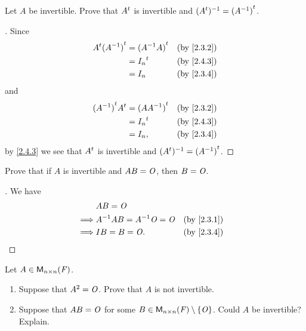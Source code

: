 \begin{ex}\label{ex:2.4.5}
	Let \(A\) be invertible.
	Prove that \({A}^{t}\) is invertible and \(({A}^{t})^{-1} = {(A^{-1})}^{t}\).
\end{ex}

\begin{proof}[]
	Since
	\begin{align*}
		\tp{A} \tp{(A^{-1})} & = \tp{(A^{-1} A)} &  & \by{2.3.2} \\
		                     & = \tp{I_n}        &  & \by{2.4.3} \\
		                     & = I_n             &  & \by{2.3.4}
	\end{align*}
	and
	\begin{align*}
		\tp{(A^{-1})} \tp{A} & = \tp{(A A^{-1})} &  & \by{2.3.2} \\
		                     & = \tp{I_n}        &  & \by{2.4.3} \\
		                     & = I_n,            &  & \by{2.3.4}
	\end{align*}
	by \cref{2.4.3} we see that \({A}^{t}\) is invertible and \(({A}^{t})^{-1} = {(A^{-1})}^{t}\).
\end{proof}

\begin{ex}\label{ex:2.4.6}
	Prove that if \(A\) is invertible and \(AB = \mathit{O}\), then \(B = \mathit{O}\).
\end{ex}

\begin{proof}[]
	We have
	\begin{align*}
		         & AB = \zm                                     \\
		\implies & A^{-1} AB = A^{-1} \zm = \zm &  & \by{2.3.1} \\
		\implies & IB = B = \zm.                &  & \by{2.3.4}
	\end{align*}
\end{proof}

\begin{ex}\label{ex:2.4.7}
	Let \(A \in \mathsf{M}_{{n} \times n}({\mathit{F}})\).
	\begin{enumerate}
		\item Suppose that \(A^2 = \mathit{O}\).
		      Prove that \(A\) is not invertible.
		\item Suppose that \(AB = \mathit{O}\) for some \(B \in \mathsf{M}_{{n} \times n}({\mathit{F}}) \setminus \left\lbrace\mathit{O}\right\rbrace\).
		      Could \(A\) be invertible?
		      Explain.
	\end{enumerate}
\end{ex}

